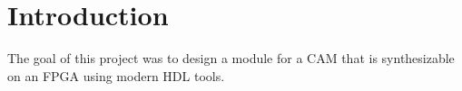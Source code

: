 \section{Introduction}
The goal of this project was to design a module for a CAM that is synthesizable on an FPGA using modern HDL tools. 